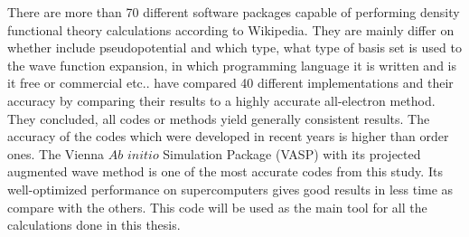 There are more than 70 different software packages capable of performing density functional theory calculations according to Wikipedia\cite{dft_sws}. They are mainly differ on whether include pseudopotential and which type, what type of basis set is used to the wave function expansion, in which programming language it is written and is it free or commercial etc.. \citet{Lejaeghereaad3000} have compared 40 different implementations and their accuracy by comparing their results to a highly accurate all-electron method. They concluded, all codes or methods yield generally consistent results. The accuracy of the codes which were developed in recent years is higher than order ones. The Vienna $Ab$ $initio$ Simulation Package (VASP) \cite{VASP1,VASP2} with its projected augmented wave method is one of the most accurate codes from this study. Its well-optimized performance on supercomputers gives good results in less time as compare with the others. This code will be used as the main tool for all the calculations done in this thesis.